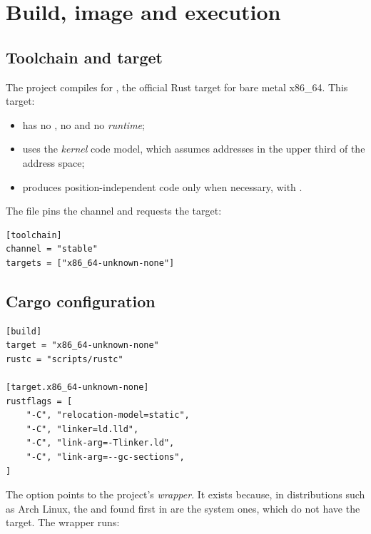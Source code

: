\chapter{Build, image and execution}
\label{cap:build}

\section{Toolchain and target}

The project compiles for , the official Rust target
for bare metal x86\_64. This target:

\begin{itemize}
  \item has no , no  and no \emph{runtime};
  \item uses the \emph{kernel} code model, which assumes addresses in the
        upper third of the address space;
  \item produces position-independent code only when necessary, with
        .
\end{itemize}

The  file pins the  channel and requests
the target:

\begin{lstlisting}[caption={\code{rust-toolchain.toml}.},label={lst:toolchain}]
[toolchain]
channel = "stable"
targets = ["x86_64-unknown-none"]
\end{lstlisting}

\section{Cargo configuration}

\begin{lstlisting}[caption={\code{.cargo/config.toml}.},label={lst:cargoconfig}]
[build]
target = "x86_64-unknown-none"
rustc = "scripts/rustc"

[target.x86_64-unknown-none]
rustflags = [
    "-C", "relocation-model=static",
    "-C", "linker=ld.lld",
    "-C", "link-arg=-Tlinker.ld",
    "-C", "link-arg=--gc-sections",
]
\end{lstlisting}

The  option points to the project's 
\emph{wrapper}. It exists because, in distributions such as Arch Linux, the
 and  found first in  are the system ones,
which do not have the  target. The wrapper runs:

